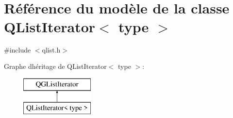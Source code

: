 \hypertarget{class_q_list_iterator}{}\section{Référence du modèle de la classe Q\+List\+Iterator$<$ type $>$}
\label{class_q_list_iterator}


{\ttfamily \#include $<$qlist.\+h$>$}

Graphe d\textquotesingle{}héritage de Q\+List\+Iterator$<$ type $>$\+:\begin{figure}[H]
\begin{center}
\leavevmode
\includegraphics[height=2.000000cm]{class_q_list_iterator}
\end{center}
\end{figure}
